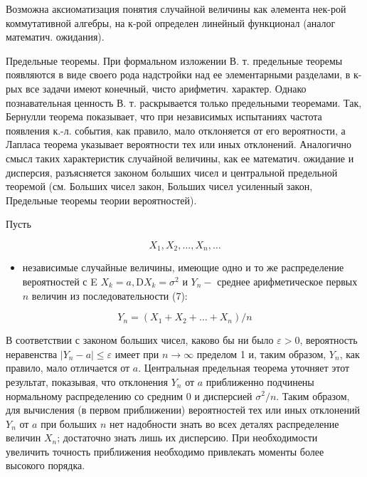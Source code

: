 \documentclass[10pt]{article}
\begin{document}
Возможна аксиоматизация понятия случайной величины как әлемента нек-рой коммутативной алгебры, на к-рой определен линейный функционал (аналог математич. ожидания).



Предельные теоремы. При формальном изложении В. т. предельные теоремы появляются в виде своего рода надстройки над ее элементарными разделами, в к-рых все задачи имеют конечный, чисто арифметич. характер. Однако познавательная ценность В. т. раскрывается только предельными теоремами. Так, Бернулли теорема показывает, что при независимых испытаниях частота появления к.-л. события, как правило, мало отклоняется от его вероятности, а Лапласа теорема указывает вероятности тех или иных отклонений. Аналогично смысл таких характеристик случайной величины, как ее математич. ожидание и дисперсия, разъясняется законом болыших чисел и центральной предельной теоремой (см. Больших чисел закон, Больших чисел усиленный закон, Предельные теоремы теории вероятностей).



Пусть



\[

X_{1}, X_{2}, \ldots, X_{n}, \ldots

\]



\begin{itemize}

  \item независимые случайные величины, имеющие одно и то же распределение вероятностей с E $X_{k}=a, \mathrm{D} X_{k}=\sigma^{2}$ и $Y_{n}-$ среднее арифметическое первых $n$ величин из последовательности (7):

\end{itemize}



\[

Y_{n}=\left(X_{1}+X_{2}+\ldots+X_{n}\right) / n

\]



В соответствии с законом больших чисел, каково бы ни было $\varepsilon>0$, вероятность неравенства $\left|Y_{n}-a\right| \leqslant \varepsilon$ имеет при $n \rightarrow \infty$ пределом 1 и, таким образом, $Y_{n}$, как правило, мало отличается от $a$. Центральная предельная теорема уточняет этот результат, показывая, что отклонения $Y_{n}$ от $a$ приближенно подчинены нормальному распределению со средним 0 и дисперсией $\sigma^{2} / n$. Таким образом, для вычисления (в первом приближении) вероятностей тех или иных отклонений $Y_{n}$ от $a$ при больших $n$ нет надобности знать во всех деталях распределение величин $X_{n}$; достаточно знать лишь их дисперсию. При необходимости увеличить точность приближения необходимо привлекать моменты более высокого порядка.
\end{document}
